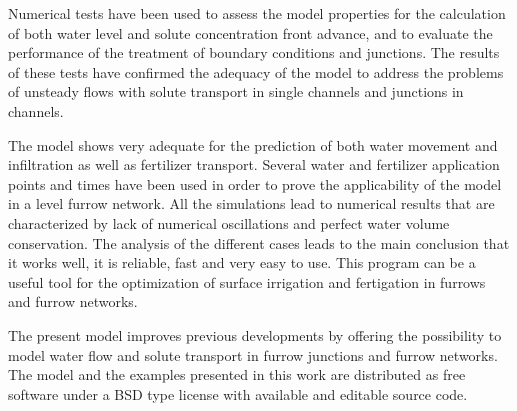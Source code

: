 \documentclass[review,authoryear]{elsarticle}
\begin{document}
Numerical tests have been used to assess the model properties for the
calculation of both water level and solute concentration front advance, and to
evaluate the performance of the treatment of boundary conditions and junctions.
The results of these tests have confirmed the adequacy of the model to address
the problems of unsteady flows with solute transport in single channels and
junctions in channels. 

The model shows very adequate for the prediction of both water movement and
infiltration as well as fertilizer transport. Several water and fertilizer
application points and times have been used in order to prove the applicability
of the model in a level furrow network. All the simulations lead to numerical
results that are characterized by lack of numerical oscillations and perfect
water volume conservation. The analysis of the different cases leads to the main
conclusion that it works well, it is reliable, fast and very easy to use. This
program can be a useful tool for the optimization of surface irrigation and
fertigation in furrows and furrow networks.

The present model improves previous developments by offering the
possibility to model water flow and solute transport in furrow junctions and
furrow networks. The model and the examples presented in this work are
distributed \citep{Surcos,SurcosGit} as free software under a BSD type license
with available and editable source code.
\end{document}
